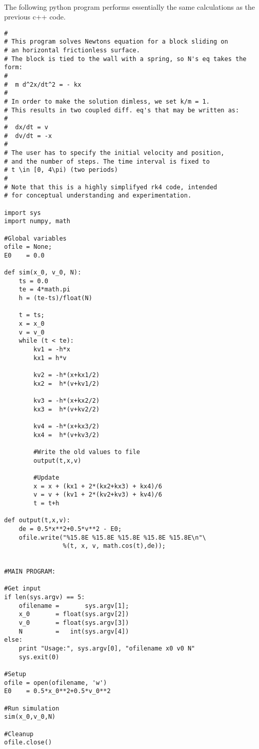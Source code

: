 \documentclass[%
oneside,                 %
final,                   %
10pt]{article}
\begin{document}
\paragraph{}
The following python program performs essentially the same calculations as the previous c++ code.
\begin{verbatim}
#
# This program solves Newtons equation for a block sliding on
# an horizontal frictionless surface.
# The block is tied to the wall with a spring, so N's eq takes the form:
#
#  m d^2x/dt^2 = - kx
#
# In order to make the solution dimless, we set k/m = 1.
# This results in two coupled diff. eq's that may be written as:
#
#  dx/dt = v
#  dv/dt = -x
#
# The user has to specify the initial velocity and position,
# and the number of steps. The time interval is fixed to
# t \in [0, 4\pi) (two periods)
#
# Note that this is a highly simplifyed rk4 code, intended
# for conceptual understanding and experimentation.

import sys
import numpy, math

#Global variables
ofile = None;
E0    = 0.0

def sim(x_0, v_0, N):
    ts = 0.0
    te = 4*math.pi
    h = (te-ts)/float(N)

    t = ts;
    x = x_0
    v = v_0
    while (t < te):
        kv1 = -h*x
        kx1 = h*v

        kv2 = -h*(x+kx1/2)
        kx2 =  h*(v+kv1/2)

        kv3 = -h*(x+kx2/2)
        kx3 =  h*(v+kv2/2)

        kv4 = -h*(x+kx3/2)
        kx4 =  h*(v+kv3/2)

        #Write the old values to file
        output(t,x,v)

        #Update
        x = x + (kx1 + 2*(kx2+kx3) + kx4)/6
        v = v + (kv1 + 2*(kv2+kv3) + kv4)/6
        t = t+h
        
def output(t,x,v):
    de = 0.5*x**2+0.5*v**2 - E0;
    ofile.write("%15.8E %15.8E %15.8E %15.8E %15.8E\n"\
                %(t, x, v, math.cos(t),de));


#MAIN PROGRAM:

#Get input
if len(sys.argv) == 5:
    ofilename =       sys.argv[1];
    x_0       = float(sys.argv[2])
    v_0       = float(sys.argv[3])
    N         =   int(sys.argv[4])
else:
    print "Usage:", sys.argv[0], "ofilename x0 v0 N"
    sys.exit(0)

#Setup
ofile = open(ofilename, 'w')
E0    = 0.5*x_0**2+0.5*v_0**2

#Run simulation
sim(x_0,v_0,N)

#Cleanup
ofile.close() 

\end{verbatim}
\end{document}
